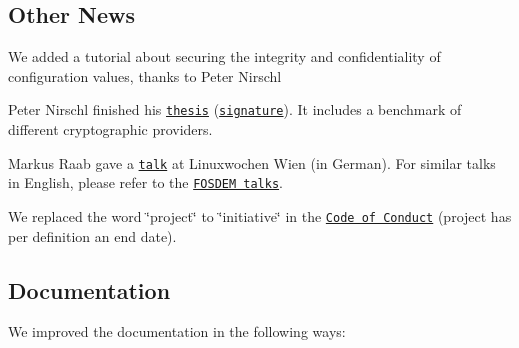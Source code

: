 \subsection*{Other News}


\begin{DoxyItemize}
\item We added a tutorial about securing the integrity and confidentiality of configuration values, thanks to Peter Nirschl
\item Peter Nirschl finished his \href{https://www.libelektra.org/ftp/elektra/publications/nirschl2018cryptographic.pdf}{\tt thesis} (\href{https://www.libelektra.org/ftp/elektra/publications/nirschl2018cryptographic.pdf.sig}{\tt signature}). It includes a benchmark of different cryptographic providers.
\item Markus Raab gave a \href{https://cfp.linuxwochen.at/de/LWW18/public/events/798}{\tt talk} at Linuxwochen Wien (in German). For similar talks in English, please refer to the \href{https://fosdem.org/2018/schedule/speaker/markus_raab/}{\tt F\+O\+S\+D\+EM talks}.
\item We replaced the word \char`\"{}project\char`\"{} to \char`\"{}initiative\char`\"{} in the \href{https://www.libelektra.org/devgettingstarted/code-of-conduct}{\tt Code of Conduct} (project has per definition an end date).
\end{DoxyItemize}

\subsection*{Documentation}

We improved the documentation in the following ways\+:


